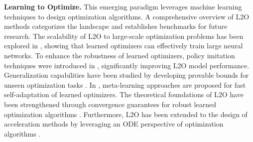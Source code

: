 \documentclass{article}
\begin{document}
\textbf{Learning to Optimize.}
This emerging paradigm leverages machine learning techniques to design optimization algorithms. A comprehensive overview of L2O methods \cite{chen2022learning} categorizes the landscape and establishes benchmarks for future research. The scalability of L2O to large-scale optimization problems has been explored in \cite{chen2022scalable}, showing that learned optimizers can effectively train large neural networks. To enhance the robustness of learned optimizers, policy imitation techniques were introduced in \cite{chen2020training}, significantly improving L2O model performance. Generalization capabilities have been studied by developing provable bounds for unseen optimization tasks \cite{yang2023learning}. In \cite{yang2023ml2o}, meta-learning approaches are proposed for fast self-adaptation of learned optimizers. The theoretical foundations of L2O have been strengthened through convergence guarantees for robust learned optimization algorithms \cite{song2024towards}. Furthermore, L2O has been extended to the design of acceleration methods by leveraging an ODE perspective of optimization algorithms \cite{xie2024ode}.

\end{document}
